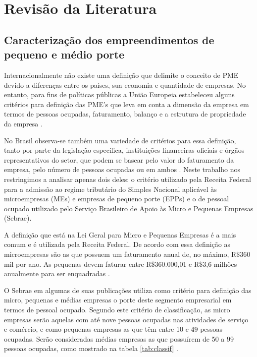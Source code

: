 \chapter{Revisão da Literatura}
\label{cap:theory}

\section{Caracterização dos empreendimentos de pequeno e médio porte}
\label{sec:temp}

Internacionalmente não existe uma definição que delimite o conceito de PME devido a diferenças entre os países, sua economia e quantidade de empresas. No entanto, para fins de políticas públicas a União Europeia estabeleceu alguns critérios para definição das PME’s que leva em conta a dimensão da empresa em termos de pessoas ocupadas, faturamento, balanço e a estrutura de propriedade da empresa \cite{mpme2018}.

No Brasil observa-se também uma variedade de critérios para essa definição, tanto por parte da legislação específica, instituições financeiras oficiais e órgãos representativos do setor, que podem se basear pelo valor do faturamento da empresa, pelo número de pessoas ocupadas ou em ambos \cite{mpme2017}. Neste trabalho nos restringimos a analisar apenas dois deles:  o critério utilizado pela Receita Federal para a admissão ao regime tributário do Simples Nacional aplicável às microempresas (MEs) e empresas de pequeno porte (EPPs) e o de pessoal ocupado utilizado pelo Serviço Brasileiro de Apoio às Micro e Pequenas Empresas (Sebrae).

A definição que está na Lei Geral para Micro e Pequenas Empresas é a mais comum e é utilizada pela Receita Federal. De acordo com essa definição as microempresas são as que possuem um faturamento anual de, no máximo, R\$360 mil por ano. As pequenas devem faturar entre R\$360.000,01 e R\$3,6 milhões anualmente para ser enquadradas \cite{sebrae2016}.

O Sebrae em algumas de suas publicações utiliza como critério para definição das micro, pequenas e médias empresas o porte deste segmento empresarial em termos de pessoal ocupado. Segundo este critério de classificação, as micro empresas serão aquelas com até nove pessoas ocupadas nas atividades de serviço e comércio, e como pequenas empresas as que têm entre 10 e 49 pessoas ocupadas. Serão consideradas médias empresas as que possuírem de 50 a 99 pessoas ocupadas, como mostrado na tabela \ref{tab:classif} \cite{sebrae2013}.

